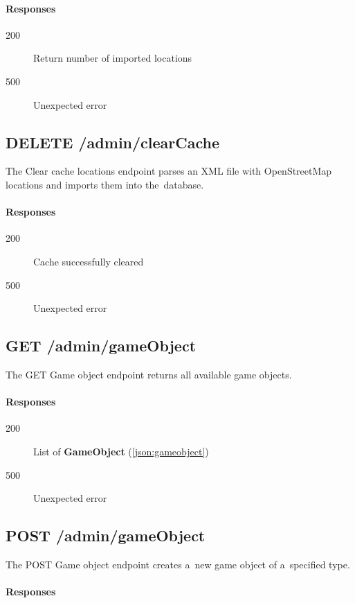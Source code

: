 		\paragraph*{Responses}
			\begin{description}		
				\item[200] Return number of imported locations
				\item[500] Unexpected error
			\end{description}
		
	\subsection{DELETE /admin/clearCache}
	The Clear cache locations endpoint parses an XML file with OpenStreetMap locations and imports them into the~database.
		\paragraph*{Responses}
			\begin{description}		
				\item[200] Cache successfully cleared
				\item[500] Unexpected error
			\end{description}
			
	\subsection{GET /admin/gameObject}
	The GET Game object endpoint returns all available game objects.
		\paragraph*{Responses}
			\begin{description}		
				\item[200] List of \textbf{GameObject} (\ref{json:gameobject})
				\item[500] Unexpected error
			\end{description}
			
	\subsection{POST /admin/gameObject}
	The POST Game object endpoint creates a~new game object of a~specified type.
		\paragraph*{Responses}
